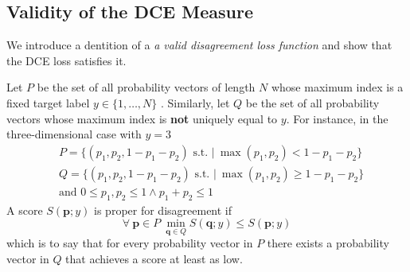 \subsection{Validity of the DCE Measure}
We introduce a dentition of a \textit{a valid disagreement loss function} and show that the DCE loss satisfies it.
\begin{definition}
    Let $P$ be the set of all probability vectors of length $N$ whose maximum index is a fixed target label $y\in\{1,\ldots, N\}$ .
    Similarly, let $Q$ be the set of all probability vectors whose maximum index is \textbf{not} uniquely equal to $y$.
    For instance, in the three-dimensional case with $y=3$
    \begin{align*}
        &P=\{(p_1,p_2,1-p_1-p_2) \text{ s.t. } |\ {\max(p_1,p_2) < 1-p_1-p_2}\}\\
        &Q=\{(p_1,p_2,1-p_1-p_2) \text{ s.t. } |\ {\max(p_1,p_2) \geq 1-p_1-p_2}\}\\
        &\text{and } 0\leq p_1,p_2\leq 1\land p_1+p_2\leq 1
    \end{align*}
    A score $S(\mathbf{p}; y)$ is proper for disagreement if
    \begin{equation}
        \forall\ \mathbf{p}\in P\ \min_{\mathbf{q}\in Q} S(\mathbf{q}; y) \leq S(\mathbf{p}; y)
    \end{equation}
    which is to say that for every probability vector in $P$ there exists a probability vector in $Q$ that achieves a score at least as low.
\end{definition}

